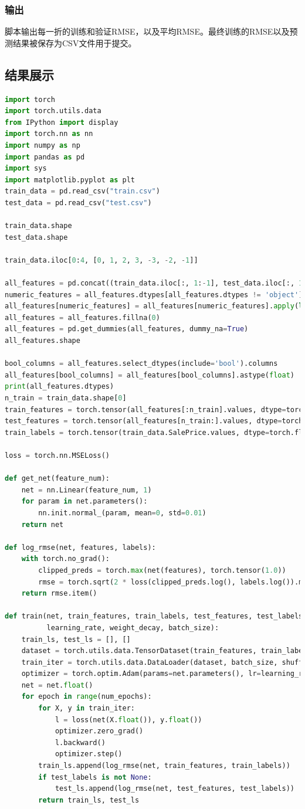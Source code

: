 \documentclass[a4paper,12pt]{article}
\begin{document}
\subsubsection{输出}
脚本输出每一折的训练和验证RMSE，以及平均RMSE。最终训练的RMSE以及预测结果被保存为CSV文件用于提交。
\subsection{结果展示}
\begin{lstlisting}[language=Python]
import torch
import torch.utils.data
from IPython import display
import torch.nn as nn
import numpy as np
import pandas as pd
import sys
import matplotlib.pyplot as plt
train_data = pd.read_csv("train.csv")
test_data = pd.read_csv("test.csv")

train_data.shape
test_data.shape

train_data.iloc[0:4, [0, 1, 2, 3, -3, -2, -1]]

all_features = pd.concat((train_data.iloc[:, 1:-1], test_data.iloc[:, 1:]))
numeric_features = all_features.dtypes[all_features.dtypes != 'object'].index
all_features[numeric_features] = all_features[numeric_features].apply(lambda x: (x - x.mean())/(x.std()))
all_features = all_features.fillna(0)
all_features = pd.get_dummies(all_features, dummy_na=True)
all_features.shape

bool_columns = all_features.select_dtypes(include='bool').columns
all_features[bool_columns] = all_features[bool_columns].astype(float)
print(all_features.dtypes)
n_train = train_data.shape[0]
train_features = torch.tensor(all_features[:n_train].values, dtype=torch.float32)
test_features = torch.tensor(all_features[n_train:].values, dtype=torch.float32)
train_labels = torch.tensor(train_data.SalePrice.values, dtype=torch.float32).view(-1, 1)

loss = torch.nn.MSELoss()

def get_net(feature_num):
	net = nn.Linear(feature_num, 1)
	for param in net.parameters():
		nn.init.normal_(param, mean=0, std=0.01)
	return net

def log_rmse(net, features, labels):
	with torch.no_grad():
		clipped_preds = torch.max(net(features), torch.tensor(1.0))
		rmse = torch.sqrt(2 * loss(clipped_preds.log(), labels.log()).mean())
	return rmse.item()
	
def train(net, train_features, train_labels, test_features, test_labels, num_epochs, 
		  learning_rate, weight_decay, batch_size):
	train_ls, test_ls = [], []
	dataset = torch.utils.data.TensorDataset(train_features, train_labels)
	train_iter = torch.utils.data.DataLoader(dataset, batch_size, shuffle=True)
	optimizer = torch.optim.Adam(params=net.parameters(), lr=learning_rate, weight_decay=weight_decay)
	net = net.float()
	for epoch in range(num_epochs):
		for X, y in train_iter:
			l = loss(net(X.float()), y.float())
			optimizer.zero_grad()
			l.backward()
			optimizer.step()
		train_ls.append(log_rmse(net, train_features, train_labels))
		if test_labels is not None:
			test_ls.append(log_rmse(net, test_features, test_labels))
		return train_ls, test_ls


\end{lstlisting}
\end{document}
